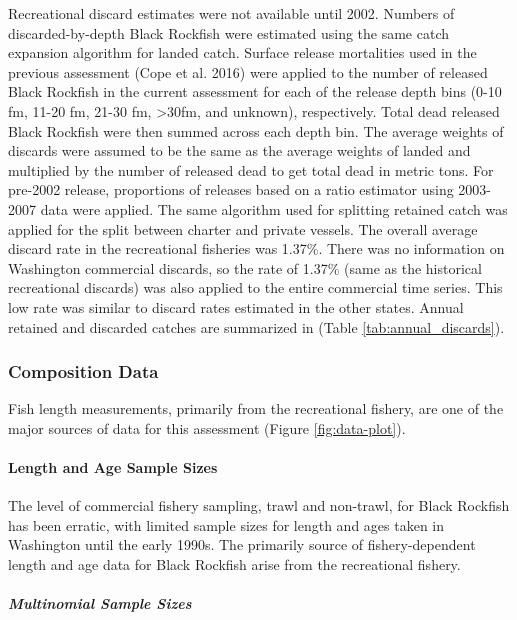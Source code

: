 \documentclass[11pt,
  english,
  letterpaper,
]{article}
\begin{document}
Recreational discard estimates were not available until 2002. Numbers of discarded-by-depth Black Rockfish were estimated using the same catch expansion algorithm for landed catch. Surface release mortalities used in the previous assessment (Cope et al. 2016) were applied to the number of released Black Rockfish in the current assessment for each of the release depth bins (0-10 fm, 11-20 fm, 21-30 fm, \textgreater30fm, and unknown), respectively. Total dead released Black Rockfish were then summed across each depth bin. The average weights of discards were assumed to be the same as the average weights of landed and multiplied by the number of released dead to get total dead in metric tons. For pre-2002 release, proportions of releases based on a ratio estimator using 2003-2007 data were applied. The same algorithm used for splitting retained catch was applied for the split between charter and private vessels. The overall average discard rate in the recreational fisheries was 1.37\%. There was no information on Washington commercial discards, so the rate of 1.37\% (same as the historical recreational discards) was also applied to the entire commercial time series. This low rate was similar to discard rates estimated in the other states. Annual retained and discarded catches are summarized in (Table \ref{tab:annual_discards}).

\hypertarget{composition-data}{%
\subsubsection{Composition Data}\label{composition-data}}

Fish length measurements, primarily from the recreational fishery, are one of the major sources of data for this assessment (Figure \ref{fig:data-plot}).

\hypertarget{length-and-age-sample-sizes}{%
\paragraph{Length and Age Sample Sizes}\label{length-and-age-sample-sizes}}

The level of commercial fishery sampling, trawl and non-trawl, for Black Rockfish has been erratic, with limited sample sizes for length and ages taken in Washington until the early 1990s. The primarily source of fishery-dependent length and age data for Black Rockfish arise from the recreational fishery.

\hypertarget{multinomial-sample-sizes}{%
\subparagraph{Multinomial Sample Sizes}\label{multinomial-sample-sizes}}
\end{document}
